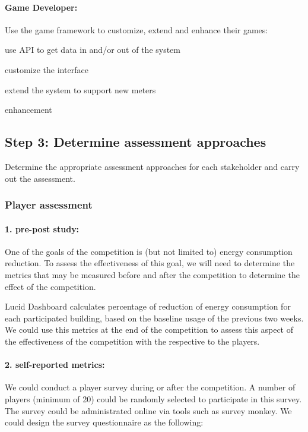 \paragraph{Game Developer:} Use the game framework to customize, extend and enhance their games:
    \begin{compactitem}
    \item use API to get data in and/or out of the system
    \item customize the interface
    \item extend the system to support new meters
    \item enhancement
    \end{compactitem}
    
\subsection{Step 3: Determine assessment approaches}
 Determine the appropriate assessment approaches for each stakeholder and carry out the assessment.

\subsubsection{Player assessment}
 
\paragraph{1. pre-post study:}

One of the goals of the competition is (but not limited to) energy consumption reduction. To assess the effectiveness of this goal, we will need to determine the metrics that may be measured before and 
after the competition to determine the effect of the competition.

Lucid Dashboard calculates percentage of reduction of energy consumption for each participated building, based on the baseline usage of the previous two weeks. 
We could use this metrics at the end of the competition to assess this aspect of the effectiveness of the competition with the respective to the players.
    
\paragraph{2. self-reported metrics: } 

We could conduct a player survey during or after the competition. A number of players (minimum of 20) could be randomly selected to participate in this survey. The survey could be administrated online via tools such as survey monkey. We could design the survey questionnaire as the following:
    
